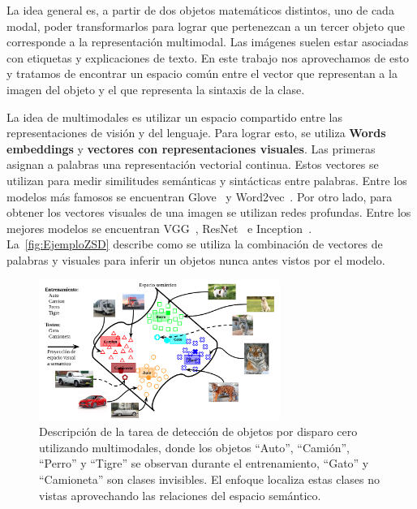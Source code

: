 La idea general es, a partir de dos objetos matemáticos distintos, uno de cada modal, poder transformarlos para lograr que pertenezcan a un tercer objeto que corresponde a la representación multimodal. Las imágenes suelen estar asociadas con etiquetas y explicaciones de texto. En este trabajo nos aprovechamos de esto y tratamos de encontrar un espacio común entre el vector que representan a la imagen del objeto y el que representa la sintaxis de la clase.

La idea de multimodales es utilizar un espacio compartido entre las representaciones de visión y del lenguaje. Para lograr esto, se utiliza  \textbf{Words embeddings} y \textbf{vectores con representaciones visuales}. Las primeras asignan a palabras una representación vectorial continua. Estos vectores se utilizan para medir similitudes semánticas y sintácticas entre palabras. Entre los modelos más famosos se encuentran Glove~\cite{pennington-etal-2014-glove} y Word2vec~\cite{mikolov2013efficient}. Por otro lado, para obtener los vectores visuales de una imagen se utilizan redes profundas. Entre los mejores modelos se encuentran VGG~\cite{simonyan2014very}, ResNet~\cite{resnet} e Inception~\cite{Szegedy_2015_CVPR}. La~\autoref{fig:EjemploZSD} describe como se utiliza la combinación de vectores de palabras y visuales para inferir un objetos nunca antes vistos por el modelo.\\

\begin{figure}[]
	\centering
	\includegraphics[width=0.7\textwidth]{img/Modelo.png}
	\caption{Descripción de la tarea de detección de objetos por disparo cero utilizando multimodales, donde los objetos ``Auto'', ``Camión'', ``Perro'' y ``Tigre'' se observan  durante el entrenamiento,  ``Gato'' y ``Camioneta'' son clases invisibles. El enfoque localiza estas clases no vistas aprovechando las relaciones del espacio semántico.}
	\label{fig:EjemploZSD}
\end{figure}
